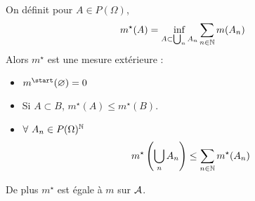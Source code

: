\documentclass{cours}
\begin{document}
            \begin{lemma}
                On définit pour $A \in P(\Omega)$, \[m^{\star}(A) = \inf_{A \subset \bigcup_{n} A_{n}} \sum_{n \in \mathbb{N}} m(A_{n})\]
                Alors $m^{\star}$ est une mesure extérieure :
                \begin{itemize}
                    \item $m^{\start}(\emptyset) = 0$
                    \item Si $A \subset B$, $m^{\star}(A) \leq m^{\star}(B)$.
                    \item $\forall \ A_{n} \in P(\Omega)^{\mathbb{N}}$ \[
                        m^{\star}\left(\bigcup_{n} A_{n}\right) \leq \sum_{n \in \mathbb{N}} m^{\star}(A_{n})
                    \]
                \end{itemize}
                De plus $m^{\star}$ est égale à $m$ sur $\mathcal{A}$.
            \end{lemma}
\end{document}
